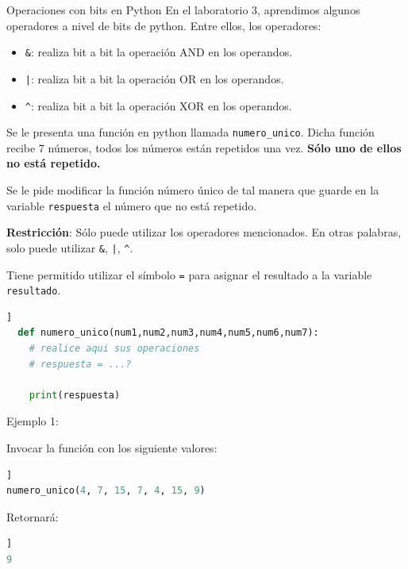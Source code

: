 \documentclass[12pt]{exam}
\begin{document}
\begin{questions}
\begin{table}[h]
{\begin{tabular}{|p{0.2\linewidth}|p{0.2\linewidth}|p{0.2\linewidth}|p{0.2\linewidth}|p{0.2\linewidth}|}
    \hline

    \end{tabular}
  }
\end{table}

\newpage

\question[5] Operaciones con bits en Python
En el laboratorio 3, aprendimos algunos operadores a nivel de bits de python. Entre ellos, los operadores:

\begin{itemize}
  \item \lstinline{&}: realiza bit a bit la operación AND en los operandos.
  \item \lstinline{|}: realiza bit a bit la operación OR en los operandos.
  \item \lstinline{^}: realiza bit a bit la operación XOR en los operandos.
\end{itemize}

Se le presenta una función en python llamada \lstinline{numero_unico}. Dicha función recibe 7 números, todos los números están repetidos una vez. \textbf{Sólo uno de ellos no está repetido.}

Se le pide modificar la función número único de tal manera que guarde en la variable \lstinline{respuesta} el número que no está repetido.

\textbf{Restricción}: Sólo puede utilizar los operadores mencionados. En otras palabras, solo puede utilizar \lstinline{&}, \lstinline{|}, \lstinline{^}.

Tiene permitido utilizar el símbolo \lstinline{=} para asignar el resultado a la variable \lstinline{resultado}.

\begin{lstlisting}[frame = single, language=python, caption=Funcion numero\_unico]]
  def numero_unico(num1,num2,num3,num4,num5,num6,num7):
    # realice aqui sus operaciones
    # respuesta = ...?
    
    print(respuesta)
\end{lstlisting}

Ejemplo 1:

Invocar la funci\'on con los siguiente valores:

\begin{lstlisting}[frame = single, language=python, caption=Ejemplo 1]]
numero_unico(4, 7, 15, 7, 4, 15, 9)
\end{lstlisting}

Retornar\'a:
\begin{lstlisting}[frame = single, language=python, caption=Output 1]]
9
\end{lstlisting}


\end{questions}
\end{document}
